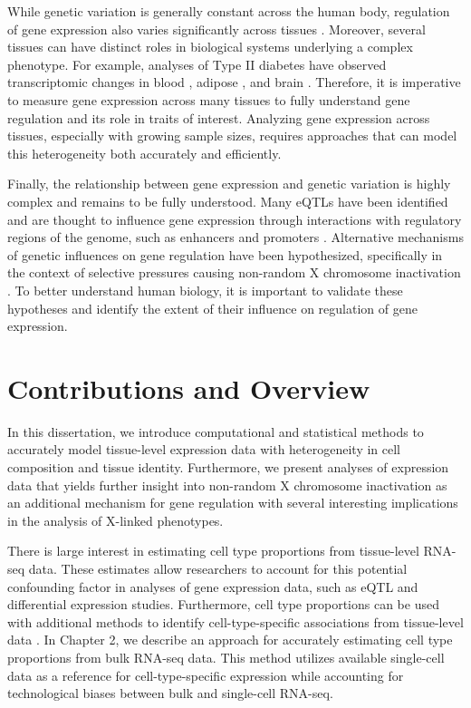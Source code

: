 While genetic variation is generally constant across the human body, regulation of gene expression also varies significantly across tissues \cite{GTEx_Consortium2020-xx}. Moreover, several tissues can have distinct roles in biological systems underlying a complex phenotype. For example, analyses of Type II diabetes have observed transcriptomic changes in blood \cite{Christodoulou2019}, adipose \cite{Miao2020}, and brain \cite{Zhou2019}. Therefore, it is imperative to measure gene expression across many tissues to fully understand gene regulation and its role in traits of interest. Analyzing gene expression across tissues, especially with growing sample sizes, requires approaches that can model this heterogeneity both accurately and efficiently.

Finally, the relationship between gene expression and genetic variation is highly complex \cite{robert2018exploring} and remains to be fully understood. Many eQTLs have been identified and are thought to influence gene expression through interactions with regulatory regions of the genome, such as enhancers and promoters \cite{Garieri2017}. Alternative mechanisms of genetic influences on gene regulation have been hypothesized, specifically in the context of selective pressures causing non-random X chromosome inactivation \cite{Migeon1998-gc}. To better understand human biology, it is important to validate these hypotheses and identify the extent of their influence on regulation of gene expression. 

\section{Contributions and Overview}
In this dissertation, we introduce computational and statistical methods to accurately model tissue-level expression data with heterogeneity in cell composition and tissue identity. Furthermore, we present analyses of expression data that yields further insight into non-random X chromosome inactivation as an additional mechanism for gene regulation with several interesting implications in the analysis of X-linked phenotypes.

There is large interest in estimating cell type proportions from tissue-level RNA-seq data. These estimates allow researchers to account for this potential confounding factor in analyses of gene expression data, such as eQTL and differential expression studies. Furthermore, cell type proportions can be used with additional methods to identify cell-type-specific associations from tissue-level data \cite{Shen-Orr2010-tg}. In Chapter 2, we describe an approach for accurately estimating cell type proportions from bulk RNA-seq data. This method utilizes available single-cell data as a reference for cell-type-specific expression while accounting for technological biases between bulk and single-cell RNA-seq.

